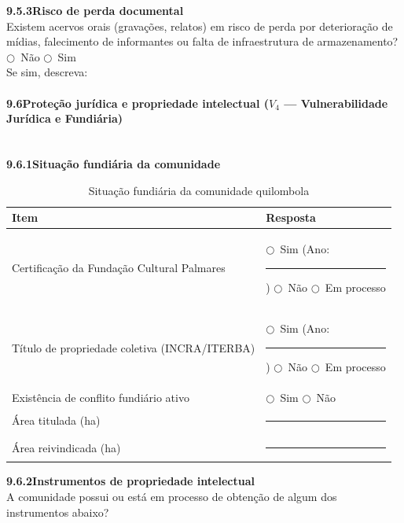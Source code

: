 \medskip\noindent\textbf{9.5.3\quad Risco de perda documental}\\[2pt]
Existem acervos orais (gravações, relatos) em risco de perda por deterioração de mídias, falecimento de informantes ou falta de infraestrutura de armazenamento?\\
$\bigcirc$~Não \quad $\bigcirc$~Sim\\[2pt]
Se sim, descreva: \dotfill

\paragraph{9.6\quad Proteção jurídica e propriedade intelectual ($V_4$ --- Vulnerabilidade Jurídica e Fundiária)}~\\[4pt]

\noindent\textbf{9.6.1\quad Situação fundiária da comunidade}

\begin{table}[htbp]
\centering\small
\caption{Situação fundiária da comunidade quilombola}
\label{tab:app_fundiaria}
\begin{tabular}{p{6cm}p{6.5cm}}
\toprule
\textbf{Item} & \textbf{Resposta} \\
\midrule
Certificação da Fundação Cultural Palmares & $\bigcirc$~Sim (Ano: \rule{1.5cm}{0.4pt}) \quad $\bigcirc$~Não \quad $\bigcirc$~Em processo \\
Título de propriedade coletiva (INCRA/ITERBA) & $\bigcirc$~Sim (Ano: \rule{1.5cm}{0.4pt}) \quad $\bigcirc$~Não \quad $\bigcirc$~Em processo \\
Existência de conflito fundiário ativo & $\bigcirc$~Sim \quad $\bigcirc$~Não \\
Área titulada (ha) & \rule{3cm}{0.4pt} \\
Área reivindicada (ha) & \rule{3cm}{0.4pt} \\
\bottomrule
\end{tabular}
\end{table}

\medskip\noindent\textbf{9.6.2\quad Instrumentos de propriedade intelectual}\\[2pt]
A comunidade possui ou está em processo de obtenção de algum dos instrumentos abaixo?

